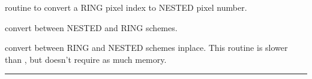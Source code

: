 \begin{modules}
  \begin{sulist}{} %
 \item[\htmlref{ring2nest}{sub:pix_tools}] routine to convert a RING pixel index to NESTED pixel number.		
  \end{sulist}
\end{modules}
\begin{related}
  \begin{sulist}{} %
  \item[\htmlref{convert\_nest2ring}{sub:convert_ring2nest}] convert between
  NESTED and RING schemes.
  \item[\htmlref{convert\_inplace}{sub:convert_inplace}] convert between 
    RING and NESTED schemes inplace. This routine is slower than \thedocid, but doesn't require as much memory.
  \end{sulist}
\end{related}

\rule{\hsize}{2mm}

\newpage

